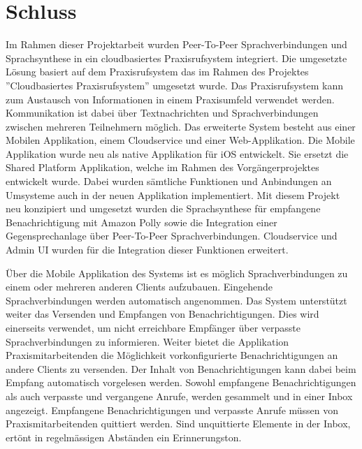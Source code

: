 \section{Schluss}

Im Rahmen dieser Projektarbeit wurden Peer-To-Peer Sprachverbindungen und Sprachsynthese in ein cloudbasiertes Praxisrufsystem integriert.
Die umgesetzte Lösung basiert auf dem Praxisrufsystem das im Rahmen des Projektes ''Cloudbasiertes Praxisrufsystem'' umgesetzt wurde.
Das Praxisrufsystem kann zum Austausch von Informationen in einem Praxisumfeld verwendet werden.
Kommunikation ist dabei über Textnachrichten und Sprachverbindungen zwischen mehreren Teilnehmern möglich.
Das erweiterte System besteht aus einer Mobilen Applikation, einem Cloudservice und einer Web-Applikation.
Die Mobile Applikation wurde neu als native Applikation für iOS entwickelt.
Sie ersetzt die Shared Platform Applikation, welche im Rahmen des Vorgängerprojektes entwickelt wurde.
Dabei wurden sämtliche Funktionen und Anbindungen an Umsysteme auch in der neuen Applikation implementiert.
Mit diesem Projekt neu konzipiert und umgesetzt wurden die Sprachsynthese für empfangene Benachrichtigung mit Amazon Polly sowie die Integration einer Gegensprechanlage über Peer-To-Peer Sprachverbindungen.
Cloudservice und Admin UI wurden für die Integration dieser Funktionen erweitert.

Über die Mobile Applikation des Systems ist es möglich Sprachverbindungen zu einem oder mehreren anderen Clients aufzubauen.
Eingehende Sprachverbindungen werden automatisch angenommen.
Das System unterstützt weiter das Versenden und Empfangen von Benachrichtigungen.
Dies wird einerseits verwendet, um nicht erreichbare Empfänger über verpasste Sprachverbindungen zu informieren.
Weiter bietet die Applikation Praxismitarbeitenden die Möglichkeit vorkonfigurierte Benachrichtigungen an andere Clients zu versenden.
Der Inhalt von Benachrichtigungen kann dabei beim Empfang automatisch vorgelesen werden.
Sowohl empfangene Benachrichtigungen als auch verpasste und vergangene Anrufe, werden gesammelt und in einer Inbox angezeigt.
Empfangene Benachrichtigungen und verpasste Anrufe müssen von Praxismitarbeitenden quittiert werden.
Sind unquittierte Elemente in der Inbox, ertönt in regelmässigen Abständen ein Erinnerungston.

